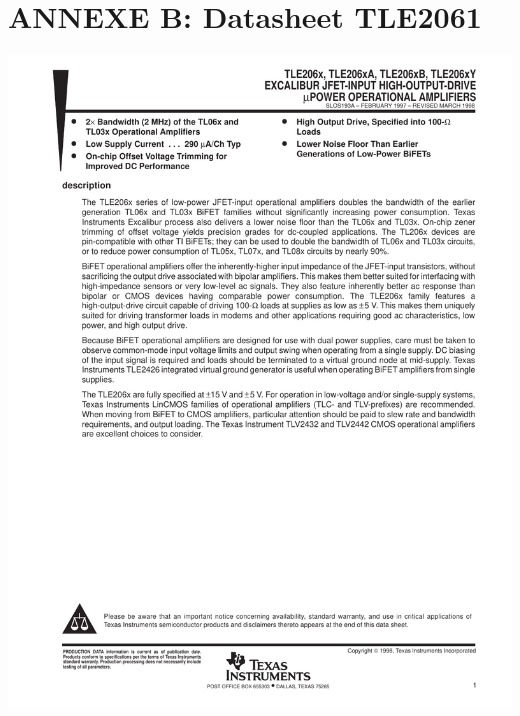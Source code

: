 \section*{ANNEXE B: Datasheet TLE2061}
\vspace{-0.1cm}
\label{DatasheetTLE2061}
\begin{center}
\includegraphics[scale=0.8, page=2]{tle2061.pdf}
\end{center}

